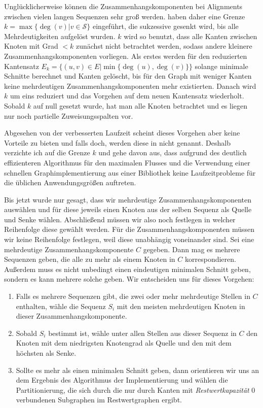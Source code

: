 Unglücklicherweise können die Zusammenhangskomponenten bei Alignments zwischen vielen langen Sequenzen sehr groß werden. \cite{cpm10} haben daher eine Grenze $k = \max\{\deg(v)| v \in \mathcal{S}\}$ eingeführt, die sukzessive gesenkt wird, bis alle Mehrdeutigkeiten aufgelöst wurden. $k$ wird so benutzt, dass alle Kanten zwischen Knoten mit Grad $< k$ zunächst nicht betrachtet werden, sodass andere kleinere Zusammenhangskomponenten vorliegen. Als erstes werden für den reduzierten Kantensatz $E_k = \{(u,v) \in E|\min\{\deg(u),\deg(v)\}\}$ solange minimale Schnitte berechnet und Kanten gelöscht, bis für den Graph mit weniger Kanten keine mehrdeutigen Zusammenhangskomponenten mehr existierten. Danach wird $k$ um eins reduziert und das Vorgehen auf dem neuen Kantensatz wiederholt. Sobald $k$ auf null gesetzt wurde, hat man alle Knoten betrachtet und es liegen nur noch partielle Zuweisungsspalten vor. 

Abgesehen von der verbesserten Laufzeit scheint dieses Vorgehen aber keine Vorteile zu bieten und falls doch, werden diese in \cite{cpm10} nicht genannt. Deshalb verzichte ich auf die Grenze $k$ und gehe davon aus, dass aufgrund des deutlich effizienteren Algorithmus für den maximalen Flusses und die Verwendung einer schnellen Graphimplementierung aus einer Bibliothek keine Laufzeitprobleme für die üblichen Anwendungsgrößen auftreten. 

Bis jetzt wurde nur gesagt, dass wir mehrdeutige Zusammenhangskomponenten auswählen und für diese jeweils einen Knoten aus der selben Sequenz als Quelle und Senke wählen. Abschließend müssen wir also noch festlegen in welcher Reihenfolge diese gewählt werden. Für die Zusammenhangskomponenten müssen wir keine Reihenfolge festlegen, weil diese unabhängig voneinander sind. Sei eine mehrdeutige Zusammenhangskomponente $C$ gegeben. Dann mag es mehrere Sequenzen geben, die alle zu mehr als einem Knoten in $C$ korrespondieren. Außerdem muss es nicht unbedingt einen eindeutigen minimalen Schnitt geben, sondern es kann mehrere solche geben. Wir entscheiden uns für dieses Vorgehen:

\begin{enumerate}[topsep=0pt,itemsep=-1ex,partopsep=1ex,parsep=1ex]
	\item Falls es mehrere Sequenzen gibt, die zwei oder mehr mehrdeutige Stellen in $C$ enthalten, wähle die Sequenz $S_i$ mit den meisten mehrdeutigen Knoten in dieser Zusammenhangskomponente.
	\item Sobald $S_i$ bestimmt ist, wähle unter allen Stellen aus dieser Sequenz in $C$ den Knoten mit dem niedrigsten Knotengrad als Quelle und den mit dem höchsten als Senke.
	\item Sollte es mehr als einen minimalen Schnitt geben, dann orientieren wir uns an dem Ergebnis des Algorithmus der Implementierung und wählen die Partitionierung, die sich durch die nur durch Kanten mit \emph{Restwertkapazität} 0 verbundenen Subgraphen im Restwertgraphen ergibt. 
\end{enumerate}

